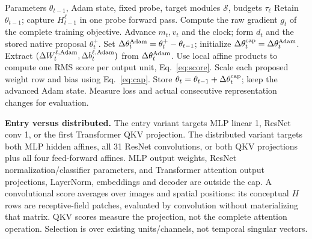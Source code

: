 \documentclass[11pt,a4paper]{article}
\begin{document}
\begin{algorithm}[H]
\caption{Local representation displacement cap at update $t$}
\label{alg:cap}
\begin{algorithmic}[1]
\Require Parameters $\theta_{t-1}$, Adam state, fixed probe, target modules $\mathcal S$, budgets $\tau_\ell$
\State Retain $\theta_{t-1}$; capture $H_{t-1}^\ell$ in one probe forward pass.
\State Compute the raw gradient $g_t$ of the complete training objective.
\State Advance $m_t,v_t$ and the clock; form $d_t$ and the stored native proposal $\theta_t^+$.
\State Set $\Delta\theta_t^{\rm Adam}=\theta_t^+-\theta_{t-1}$; initialize $\Delta\theta_t^{\rm cap}=\Delta\theta_t^{\rm Adam}$.
  \State Extract $(\Delta W_t^{\ell,\rm Adam},\Delta b_t^{\ell,\rm Adam})$ from $\Delta\theta_t^{\rm Adam}$.
  \State Use local affine products to compute one RMS score per output unit, Eq.~\eqref{eq:score}.
  \State Scale each proposed weight row and bias using Eq.~\eqref{eq:cap}.
\EndFor
\State Store $\theta_t=\theta_{t-1}+\Delta\theta_t^{\rm cap}$; keep the advanced Adam state.
\State Measure loss and actual consecutive representation changes for evaluation.
\end{algorithmic}
\end{algorithm}

\textbf{Entry versus distributed.} The entry variant targets MLP linear 1,
ResNet conv 1, or the first Transformer QKV projection. The distributed variant
targets both MLP hidden affines, all 31 ResNet convolutions, or both QKV
projections plus all four feed-forward affines. MLP output weights, ResNet
normalization/classifier parameters, and Transformer attention output projections,
LayerNorm, embeddings and decoder are outside the cap. A convolutional score
averages over images and spatial positions: its conceptual $H$ rows are
receptive-field patches, evaluated by convolution without materializing that matrix.
QKV scores measure the projection, not the complete attention operation.
Selection is over existing units/channels, not temporal singular vectors.
\end{document}

